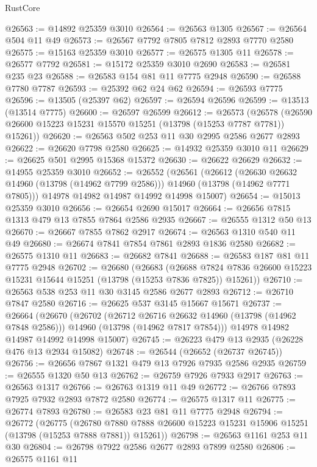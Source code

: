\begin{lexlean}{RustCore}
\begin{coremodule}
@26563 := @14892 @25359 @3010
@26564 := @26563 @1305
@26567 := @26564 @504 @11 @49
@26573 := @26567 @7792 @7805 @7812 @2893 @7770 @2580
@26575 := @15163 @25359 @3010
@26577 := @26575 @1305 @11
@26578 := @26577 @7792
@26581 := @15172 @25359 @3010 @2690
@26583 := @26581 @235 @23
@26588 := @26583 @154 @81 @11 @7775 @2948
@26590 := @26588 @7780 @7787
@26593 := @25392 @62 @24 @62
@26594 := @26593 @7775
@26596 := @13505 (@25397 @62)
@26597 := @26594 @26596
@26599 := @13513 (@13514 @7775)
@26600 := @26597 @26599
@26612 := @26573
    (@26578 (@26590 @26600 @15223 @15231 @15570 @15251 (@13798 (@15253 @7787 @7781)) @15261))
@26620 := @26563 @502 @253 @11 @30 @2995 @2586 @2677 @2893
@26622 := @26620 @7798 @2580
@26625 := @14932 @25359 @3010 @11
@26629 := @26625 @501 @2995 @15368 @15372
@26630 := @26622 @26629
@26632 := @14955 @25359 @3010
@26652 := @26552
    (@26561
      (@26612
        (@26630 @26632 @14960 (@13798 (@14962 @7799 @2586)))
        @14960
        (@13798 (@14962 @7771 @7805)))
      @14978
      @14982
      @14987
      @14992
      @14998
      @15007)
@26654 := @15013 @25359 @3010
@26656 := @26654 @2690 @15017
@26664 := @26656 @7815 @1313 @479 @13 @7855 @7864 @2586 @2935
@26667 := @26555 @1312 @50 @13
@26670 := @26667 @7855 @7862 @2917
@26674 := @26563 @1310 @540 @11 @49
@26680 := @26674 @7841 @7854 @7861 @2893 @1836 @2580
@26682 := @26575 @1310 @11
@26683 := @26682 @7841
@26688 := @26583 @187 @81 @11 @7775 @2948
@26702 := @26680
    (@26683
      (@26688 @7824 @7836 @26600 @15223 @15231 @15644 @15251 (@13798 (@15253 @7836 @7825)) @15261))
@26710 := @26563 @538 @253 @11 @30 @3145 @2586 @2677 @2893
@26712 := @26710 @7847 @2580
@26716 := @26625 @537 @3145 @15667 @15671
@26737 := @26664
    (@26670
      (@26702
        (@26712 @26716 @26632 @14960 (@13798 (@14962 @7848 @2586)))
        @14960
        (@13798 (@14962 @7817 @7854)))
      @14978
      @14982
      @14987
      @14992
      @14998
      @15007)
@26745 := @26223 @479 @13 @2935 (@26228 @476 @13 @2934 @15082)
@26748 := @26544 (@26652 (@26737 @26745))
@26756 := @26656 @7867 @1321 @479 @13 @7926 @7935 @2586 @2935
@26759 := @26555 @1320 @50 @13
@26762 := @26759 @7926 @7933 @2917
@26763 := @26563 @1317
@26766 := @26763 @1319 @11 @49
@26772 := @26766 @7893 @7925 @7932 @2893 @7872 @2580
@26774 := @26575 @1317 @11
@26775 := @26774 @7893
@26780 := @26583 @23 @81 @11 @7775 @2948
@26794 := @26772
    (@26775
      (@26780 @7880 @7888 @26600 @15223 @15231 @15906 @15251 (@13798 (@15253 @7888 @7881)) @15261))
@26798 := @26563 @1161 @253 @11 @30
@26804 := @26798 @7922 @2586 @2677 @2893 @7899 @2580
@26806 := @26575 @1161 @11

\end{coremodule}
\end{lexlean}
